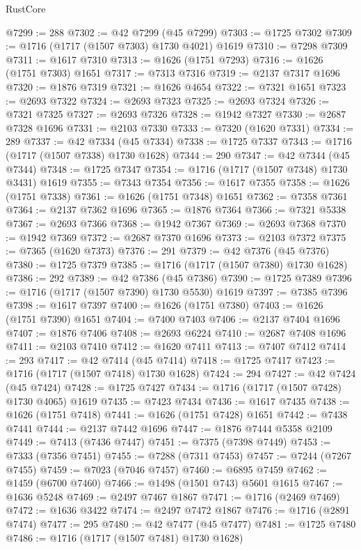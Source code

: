 \begin{lexlean}{RustCore}
\begin{coremodule}
@7299 := 288
@7302 := @42 @7299 (@45 @7299)
@7303 := @1725 @7302
@7309 := @1716 (@1717 (@1507 @7303) @1730 @4021) @1619
@7310 := @7298 @7309
@7311 := @1617 @7310
@7313 := @1626 (@1751 @7293)
@7316 := @1626 (@1751 @7303) @1651
@7317 := @7313 @7316
@7319 := @2137 @7317 @1696
@7320 := @1876 @7319
@7321 := @1626 @4654
@7322 := @7321 @1651
@7323 := @2693 @7322
@7324 := @2693 @7323
@7325 := @2693 @7324
@7326 := @7321 @7325
@7327 := @2693 @7326
@7328 := @1942 @7327
@7330 := @2687 @7328 @1696
@7331 := @2103 @7330
@7333 := @7320 (@1620 @7331)
@7334 := 289
@7337 := @42 @7334 (@45 @7334)
@7338 := @1725 @7337
@7343 := @1716 (@1717 (@1507 @7338) @1730 @1628)
@7344 := 290
@7347 := @42 @7344 (@45 @7344)
@7348 := @1725 @7347
@7354 := @1716 (@1717 (@1507 @7348) @1730 @3431) @1619
@7355 := @7343 @7354
@7356 := @1617 @7355
@7358 := @1626 (@1751 @7338)
@7361 := @1626 (@1751 @7348) @1651
@7362 := @7358 @7361
@7364 := @2137 @7362 @1696
@7365 := @1876 @7364
@7366 := @7321 @5338
@7367 := @2693 @7366
@7368 := @1942 @7367
@7369 := @2693 @7368
@7370 := @1942 @7369
@7372 := @2687 @7370 @1696
@7373 := @2103 @7372
@7375 := @7365 (@1620 @7373)
@7376 := 291
@7379 := @42 @7376 (@45 @7376)
@7380 := @1725 @7379
@7385 := @1716 (@1717 (@1507 @7380) @1730 @1628)
@7386 := 292
@7389 := @42 @7386 (@45 @7386)
@7390 := @1725 @7389
@7396 := @1716 (@1717 (@1507 @7390) @1730 @5530) @1619
@7397 := @7385 @7396
@7398 := @1617 @7397
@7400 := @1626 (@1751 @7380)
@7403 := @1626 (@1751 @7390) @1651
@7404 := @7400 @7403
@7406 := @2137 @7404 @1696
@7407 := @1876 @7406
@7408 := @2693 @6224
@7410 := @2687 @7408 @1696
@7411 := @2103 @7410
@7412 := @1620 @7411
@7413 := @7407 @7412
@7414 := 293
@7417 := @42 @7414 (@45 @7414)
@7418 := @1725 @7417
@7423 := @1716 (@1717 (@1507 @7418) @1730 @1628)
@7424 := 294
@7427 := @42 @7424 (@45 @7424)
@7428 := @1725 @7427
@7434 := @1716 (@1717 (@1507 @7428) @1730 @4065) @1619
@7435 := @7423 @7434
@7436 := @1617 @7435
@7438 := @1626 (@1751 @7418)
@7441 := @1626 (@1751 @7428) @1651
@7442 := @7438 @7441
@7444 := @2137 @7442 @1696
@7447 := @1876 @7444 @5358 @2109
@7449 := @7413 (@7436 @7447)
@7451 := @7375 (@7398 @7449)
@7453 := @7333 (@7356 @7451)
@7455 := @7288 (@7311 @7453)
@7457 := @7244 (@7267 @7455)
@7459 := @7023 (@7046 @7457)
@7460 := @6895 @7459
@7462 := @1459 (@6700 @7460)
@7466 := @1498 (@1501 @743) @5601 @1615
@7467 := @1636 @5248
@7469 := @2497 @7467 @1867
@7471 := @1716 (@2469 @7469)
@7472 := @1636 @3422
@7474 := @2497 @7472 @1867
@7476 := @1716 (@2891 @7474)
@7477 := 295
@7480 := @42 @7477 (@45 @7477)
@7481 := @1725 @7480
@7486 := @1716 (@1717 (@1507 @7481) @1730 @1628)

\end{coremodule}
\end{lexlean}
